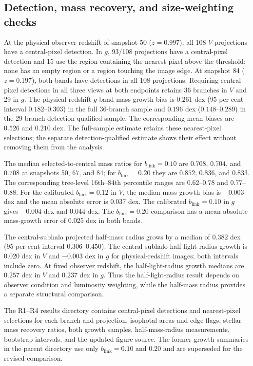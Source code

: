 \documentclass[usenatbib]{mnras}
\begin{document}
\subsection{Detection, mass recovery, and size-weighting checks}
At the physical observer redshift of snapshot 50 ($z=0.997$), all 108
$V$ projections have a central-pixel detection. In $g$, 93/108 projections
have a central-pixel detection and 15 use the region containing the
nearest pixel above the threshold;
none has an empty region or a region touching the image edge. At snapshot 84
($z=0.197$), both bands have detections in all 108 projections. Requiring
central-pixel detections in all three views at both endpoints retains 36
branches in $V$ and 29 in $g$. The physical-redshift $g$-band mass-growth
bias is $0.261$ dex (95 per cent interval $0.182$--$0.303$) in the full
36-branch sample and $0.196$ dex ($0.148$--$0.289$) in the 29-branch
detection-qualified sample. The corresponding mean biases are $0.526$ and
$0.210$ dex. The full-sample estimate retains these nearest-pixel selections; the
separate detection-qualified estimate shows their effect without removing
them from the analysis.

The median selected-to-central mass ratios for $b_{\mathrm{link}}=0.10$
are $0.708$, $0.704$, and $0.708$ at snapshots 50, 67, and 84; for
$b_{\mathrm{link}}=0.20$ they are $0.852$, $0.836$, and $0.833$. The
corresponding tree-level 16th--84th percentile ranges are $0.62$--$0.78$
and $0.77$--$0.88$. For the calibrated $b_{\mathrm{link}}=0.12$ in $V$,
the median mass-growth bias is $-0.003$ dex and the mean absolute error is
$0.037$ dex. The calibrated $b_{\mathrm{link}}=0.10$ in $g$ gives
$-0.004$ dex and $0.044$ dex. The $b_{\mathrm{link}}=0.20$ comparison has
a mean absolute mass-growth error of $0.025$ dex in both bands.

The central-subhalo projected half-mass radius grows by a median of
$0.382$ dex (95 per cent interval $0.306$--$0.450$). The central-subhalo
half-light-radius growth is $0.020$ dex in $V$ and $-0.003$ dex in $g$
for physical-redshift images; both intervals include zero. At fixed observer
redshift, the half-light-radius growth medians are $0.257$ dex in $V$ and
$0.237$ dex in $g$. Thus the half-light-radius result depends on observer
condition and luminosity weighting, while the half-mass radius provides a
separate structural comparison.

The R1--R4 results directory contains central-pixel detections and
nearest-pixel selections for each branch and projection, isophotal areas
and edge flags, stellar-mass recovery ratios, both growth samples,
half-mass-radius measurements, bootstrap intervals, and the updated
figure source. The former
growth summaries in the parent directory use only $b_{\mathrm{link}}=0.10$
and 0.20 and are superseded for the revised comparison.
\end{document}

